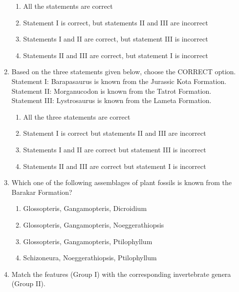 \documentclass[journal,12pt,onecolumn]{IEEEtran}
\begin{document}
\begin{enumerate}
\hfill{}
\begin{enumerate}
    \item All the statements are correct
    \item Statement I is correct, but statements II and III are incorrect
    \item Statements I and II are correct, but statement III is incorrect
    \item Statements II and III are correct, but statement I is incorrect
\end{enumerate}

\item Based on the three statements given below, choose the CORRECT option.\\
Statement I: Barapasaurus is known from the Jurassic Kota Formation.\\
Statement II: Morganucodon is known from the Tatrot Formation.\\
Statement III: Lystrosaurus is known from the Lameta Formation.

\hfill{}
\begin{enumerate}
    \item All the three statements are correct
    \item Statement I is correct but statements II and III are incorrect
    \item Statements I and II are correct but statement III is incorrect
    \item Statements II and III are correct but statement I is incorrect
\end{enumerate}

\item Which one of the following assemblages of plant fossils is known from the Barakar Formation?

\hfill{}
\begin{multicols}{2}
\begin{enumerate}
    \item Glossopteris, Gangamopteris, Dicroidium
    \item Glossopteris, Gangamopteris, Noeggerathiopsis
    \item Glossopteris, Gangamopteris, Ptilophyllum
    \item Schizoneura, Noeggerathiopsis, Ptilophyllum
\end{enumerate}
\end{multicols}

\item Match the features (Group I) with the corresponding invertebrate genera (Group II).


\end{enumerate}
\end{document}

